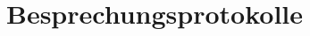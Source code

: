 \documentclass[12pt,a4paper,ngerman]{article}
\newcommand{\autoren}{}
\begin{document}
\setlength{\parindent}{0pt} %
\captionsetup{singlelinecheck=false}





\thispagestyle{empty}

\tableofcontents
\newpage
\thispagestyle{empty}
\listoffigures
\newpage
\setcounter{page}{1}





\renewcommand{\autoren}{}
\newpage
\thispagestyle{empty}
\renewcommand\refname{Literaturverzeichnis}
\printbibliography
\newpage

\appendix
\renewcommand{\autoren}{Anhang}
\setcounter{page}{1}

\section{Besprechungsprotokolle}


\end{document}
